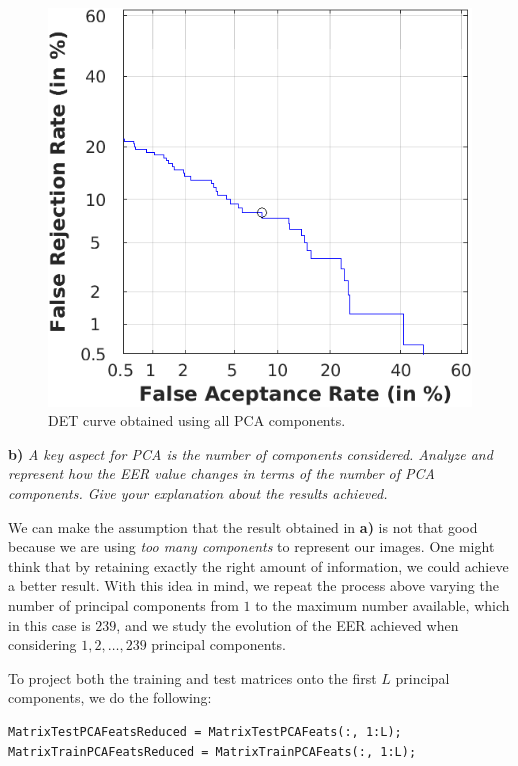 \documentclass[11pt]{article}
\begin{document}
\begin{figure}[h!]
  \centering
    \includegraphics[scale=0.75]{img/2a_det}
    \caption{DET curve obtained using all PCA components.}
    \label{fig:ex2a}
\end{figure}

\textbf{b)} \emph{A key aspect for PCA is the number of components considered. Analyze and represent how the EER value changes in terms of the number of PCA components. Give your explanation about the results achieved.}

We can make the assumption that the result obtained in \textbf{a)} is not that good because we are using \textit{too many components} to represent our images. One might think that by retaining exactly the right amount of information, we could achieve a better result. With this idea in mind, we repeat the process above varying the number of principal components from $1$ to the maximum number available, which in this case is $239$, and we study the evolution of the EER achieved when considering $1,2,\dots,239$ principal components.

To project both the training and test matrices onto the first $L$ principal components, we do the following:
\begin{verbatim}
MatrixTestPCAFeatsReduced = MatrixTestPCAFeats(:, 1:L);
MatrixTrainPCAFeatsReduced = MatrixTrainPCAFeats(:, 1:L);
\end{verbatim}
\end{document}
